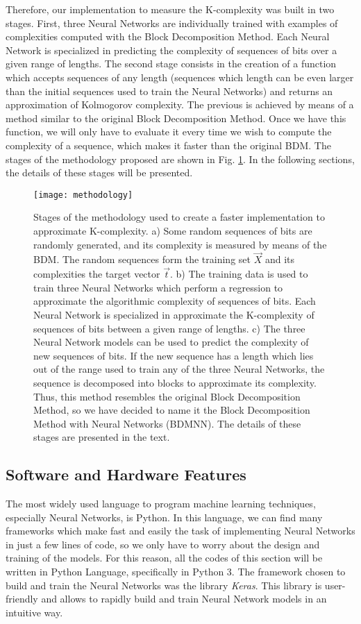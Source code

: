 Therefore, our implementation to measure the K-complexity was built in two stages. First, three Neural Networks are individually trained with examples of complexities computed with the Block Decomposition Method. Each Neural Network is specialized in predicting the complexity of sequences of bits over a given range of lengths. The second stage consists in the creation of a function which accepts sequences of any length  (sequences which length can be even larger than the initial sequences used to train the Neural Networks) and returns an approximation of Kolmogorov complexity. The previous is achieved by means of a method similar to the original Block Decomposition Method. Once we have this function, we will only have to evaluate it every time we wish to compute the complexity of a sequence, which makes it faster than the original BDM. The stages of the methodology proposed are shown in Fig. \ref{fig:methodology}. In the following sections, the details of these stages will be presented.

\begin{figure}[h]
	\centering
		\texttt{[image: methodology]}
	\caption[Stages of the methodology used to create a faster implementation to approximate K-complexity.]{Stages of the methodology used to create a faster implementation to approximate K-complexity. a) Some random sequences of bits are randomly generated, and its complexity is measured by means of the BDM. The random sequences form the training set $\vec{X}$ and its complexities the target vector $\vec{t}$. b) The training data is used to train three Neural Networks which perform a regression to approximate the algorithmic complexity of sequences of bits. Each Neural Network is specialized in approximate the K-complexity of sequences of bits between a given range of lengths. c) The three Neural Network models can be used to predict the complexity of new sequences of bits. If the new sequence has a length which lies out of the range used to train any of the three Neural Networks, the sequence is decomposed into blocks to approximate its complexity. Thus, this method resembles the original Block Decomposition Method, so we have decided to name it the Block Decomposition Method with Neural Networks (BDMNN). The details of these stages are presented in the text.}
	\label{fig:methodology}
\end{figure}

\subsection{Software and Hardware Features}
The most widely used language to program machine learning techniques, especially Neural Networks, is Python. In this language, we can find many frameworks which make fast and easily the task of implementing Neural Networks in just a few lines of code, so we only have to worry about the design and training of the models. For this reason, all the codes of this section will be written in Python Language, specifically in Python 3. The framework chosen to build and train the Neural Networks was the library \textit{Keras}. This library is user-friendly and allows to rapidly build and train Neural Network models in an intuitive way.\\

